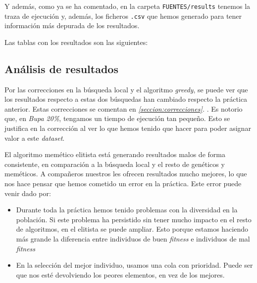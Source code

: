 \documentclass[11pt]{article}
\begin{document}
Y además, como ya se ha comentado, en la carpeta \lstinline{FUENTES/results} tenemos la traza de ejecución y, además, los ficheros \lstinline{.csv} que hemos generado para tener información más depurada de los resultados.

Las tablas con los resultados son las siguientes:



\subsection{Análisis de resultados}

Por las correcciones en la búsqueda local y el algoritmo \emph{greedy}, se puede ver que los resultados respecto a estas dos búsquedas han cambiado respecto la práctica anterior. Estas correcciones se comentan en \emph{\ref{seccion:correcciones}. }. Es notorio que, en \emph{Bupa 20\%}, tengamos un tiempo de ejecución tan pequeño. Esto se justifica en la corrección al ver lo que hemos tenido que hacer para poder asignar valor a este \emph{dataset}.

El algoritmo memético elitista está generando resultados malos de forma consistente, en comparación a la búsqueda local y el resto de genéticos y meméticos. A compañeros nuestros les ofrecen resultados mucho mejores, lo que nos hace pensar que hemos cometido un error en la práctica. Este error puede venir dado por:

\begin{itemize}
    \item Durante toda la práctica hemos tenido problemas con la diversidad en la población. Si este problema ha persistido sin tener mucho impacto en el resto de algoritmos, en el elitista se puede ampliar. Esto porque estamos haciendo más grande la diferencia entre individuos de buen \emph{fitness} e individuos de mal \emph{fitness}
    \item En la selección del mejor individuo, usamos una cola con prioridad. Puede ser que nos esté devolviendo los peores elementos, en vez de los mejores.
\end{itemize}
\end{document}
